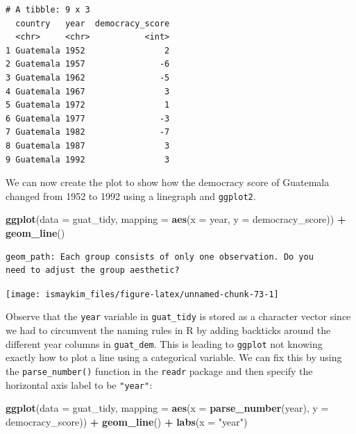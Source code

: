 \documentclass[12pt,]{krantz}
\makeatletter
\newenvironment{Shaded}{\begin{snugshade}}{\end{snugshade}}
\newcommand{\KeywordTok}[1]{\textcolor[rgb]{0.27,0.27,0.27}{\textbf{#1}}}
\newcommand{\DataTypeTok}[1]{\textcolor[rgb]{0.27,0.27,0.27}{#1}}
\newcommand{\StringTok}[1]{\textcolor[rgb]{0.5,0.5,0.5}{#1}}
\newcommand{\OperatorTok}[1]{\textcolor[rgb]{0.43,0.43,0.43}{\textbf{#1}}}
\newcommand{\NormalTok}[1]{#1}
\newenvironment{kframe}{%
\medskip{}
\setlength{\fboxsep}{.8em}
 \def\at@end@of@kframe{}%
 \ifinner\ifhmode%
  \def\at@end@of@kframe{\end{minipage}}%
  \begin{minipage}{\columnwidth}%
 \fi\fi%
 \def\FrameCommand##1{\hskip\@totalleftmargin \hskip-\fboxsep
 \colorbox{shadecolor}{##1}\hskip-\fboxsep
     \hskip-\linewidth \hskip-\@totalleftmargin \hskip\columnwidth}%
 \MakeFramed {\advance\hsize-\width
   \@totalleftmargin\z@ \linewidth\hsize
   \@setminipage}}%
 {\par\unskip\endMakeFramed%
 \at@end@of@kframe}
\renewenvironment{Shaded}{\begin{kframe}}{\end{kframe}}
\theoremstyle{definition}
\theoremstyle{definition}
\theoremstyle{definition}
\theoremstyle{remark}
\makeatother
\begin{document}
\begin{verbatim}
# A tibble: 9 x 3
  country   year  democracy_score
  <chr>     <chr>           <int>
1 Guatemala 1952                2
2 Guatemala 1957               -6
3 Guatemala 1962               -5
4 Guatemala 1967                3
5 Guatemala 1972                1
6 Guatemala 1977               -3
7 Guatemala 1982               -7
8 Guatemala 1987                3
9 Guatemala 1992                3
\end{verbatim}

We can now create the plot to show how the democracy score of Guatemala
changed from 1952 to 1992 using a linegraph and \texttt{ggplot2}.

\begin{Shaded}
\begin{Highlighting}[]
\KeywordTok{ggplot}\NormalTok{(}\DataTypeTok{data =}\NormalTok{ guat_tidy, }
       \DataTypeTok{mapping =} \KeywordTok{aes}\NormalTok{(}\DataTypeTok{x =}\NormalTok{ year, }\DataTypeTok{y =}\NormalTok{ democracy_score)) }\OperatorTok{+}
\StringTok{  }\KeywordTok{geom_line}\NormalTok{()}
\end{Highlighting}
\end{Shaded}

\begin{verbatim}
geom_path: Each group consists of only one observation. Do you
need to adjust the group aesthetic?
\end{verbatim}

\begin{center}\texttt{[image: ismaykim\_files/figure-latex/unnamed-chunk-73-1]} \end{center}

Observe that the \texttt{year} variable in \texttt{guat\_tidy} is stored
as a character vector since we had to circumvent the naming rules in R
by adding backticks around the different year columns in
\texttt{guat\_dem}. This is leading to \texttt{ggplot} not knowing
exactly how to plot a line using a categorical variable. We can fix this
by using the \texttt{parse\_number()} function in the \texttt{readr}
package and then specify the horizontal axis label to be
\texttt{"year"}:

\begin{Shaded}
\begin{Highlighting}[]
\KeywordTok{ggplot}\NormalTok{(}\DataTypeTok{data =}\NormalTok{ guat_tidy, }
       \DataTypeTok{mapping =} \KeywordTok{aes}\NormalTok{(}\DataTypeTok{x =} \KeywordTok{parse_number}\NormalTok{(year), }
                     \DataTypeTok{y =}\NormalTok{ democracy_score)) }\OperatorTok{+}
\StringTok{  }\KeywordTok{geom_line}\NormalTok{() }\OperatorTok{+}
\StringTok{  }\KeywordTok{labs}\NormalTok{(}\DataTypeTok{x =} \StringTok{"year"}\NormalTok{)}
\end{Highlighting}
\end{Shaded}
\end{document}

